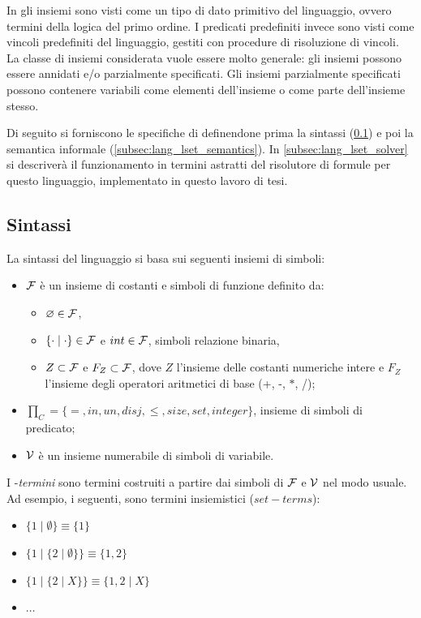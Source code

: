 \documentclass[12pt,a4paper,openright]{book} %
\begin{document}
In \lset{} gli insiemi sono visti come un tipo di dato primitivo del linguaggio, ovvero termini della logica del primo ordine. I predicati predefiniti invece sono visti come vincoli predefiniti del linguaggio, gestiti con procedure di risoluzione di vincoli. La classe di insiemi considerata vuole essere molto generale: gli insiemi possono essere annidati e/o parzialmente specificati. Gli insiemi parzialmente specificati possono contenere variabili come elementi dell’insieme o come parte dell’insieme stesso.

Di seguito si forniscono le specifiche di \lset{} definendone prima la sintassi (\ref{subsec:lang_lset_sintax}) e poi la semantica informale (\ref{subsec:lang_lset_semantics}). In \ref{subsec:lang_lset_solver} si descriverà il funzionamento in termini astratti del risolutore di formule per questo linguaggio, implementato in questo lavoro di tesi.

\subsection{Sintassi}
\label{subsec:lang_lset_sintax}

La sintassi del linguaggio \clpset{} si basa sui seguenti insiemi di simboli:

\begin{itemize}
\item $\mathcal{F}$ è un insieme di costanti e simboli di funzione definito da:    
\begin{itemize}
\item $\varnothing \in \mathcal{F}$,
\item $\{ \cdot \mid \cdot \} \in \mathcal{F}$ e $int \in \mathcal{F}$, simboli relazione binaria,
\item $Z \subset \mathcal{F}$ e $F_Z \subset \mathcal{F}$, dove $Z$ l'insieme delle costanti numeriche intere e $F_Z$ l'insieme degli operatori aritmetici di base (+, -, $\ast$, /);
\end{itemize}
\item $\prod_C = \{ =, in, un, disj, \leq, size, set, integer \}$, insieme di simboli di predicato;
\item $\mathcal{V}$ è un insieme numerabile di simboli di variabile.
\end{itemize}

I \calset{}-\textit{termini} sono termini costruiti a partire dai simboli di $\mathcal{F}$ e $\mathcal{V}$ nel modo usuale. Ad esempio, i seguenti, sono termini insiemistici ($set-terms$):
\begin{itemize}
\item $\{1 \mid \emptyset \} \equiv \{1\}$
\item $\{1 \mid \{2 \mid \emptyset \} \} \equiv \{1,2\}$
\item $\{1 \mid \{2 \mid X \} \} \equiv \{1,2 \mid X \}$
\item $\ldots$
\end{itemize}
    
\end{document}
